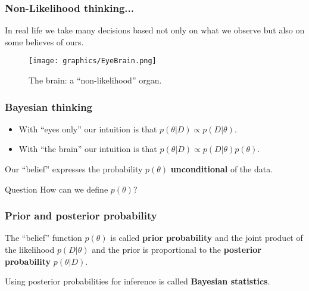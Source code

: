 \documentclass{beamer}
\newcommand{\1}{\ensuremath{\mathbf{1}}}
\begin{document}
%
%
%
\begin{frame}\frametitle{Non-Likelihood thinking...}
	In real life we take many decisions based not only on what we observe but also on some believes of ours.
	\begin{figure}
	\begin{center}
		\texttt{[image: graphics/EyeBrain.png]}
	\end{center}
	\caption{The brain: a ``non-likelihood'' organ.}
	\end{figure}
\end{frame}
%
%
%
\begin{frame}\frametitle{Bayesian thinking}
	\begin{itemize}
		\item With ``eyes only'' our intuition is that $p(\theta|D) \propto p(D|\theta)$.
		\item With ``the brain'' our intuition is that $p(\theta|D) \propto p(D|\theta)p(\theta)$.
	\end{itemize}
	Our ``belief'' expresses the probability $p(\theta)$ \textbf{unconditional} of the data.
	\begin{block}{Question}
		How can we define $p(\theta)$?
	\end{block}
\end{frame}
%
%
%
\begin{frame}\frametitle{Prior and posterior probability}
	\begin{block}{}
		The ``belief'' function $p(\theta)$ is called \textbf{prior probability} and the joint product of the likelihood $p(D|\theta)$ and the prior is proportional to the \textbf{posterior probability} $p(\theta|D)$.
	\end{block}
	\begin{block}{}
		Using posterior probabilities for inference is called \textbf{Bayesian statistics}.
	\end{block}
\end{frame}
\end{document}
